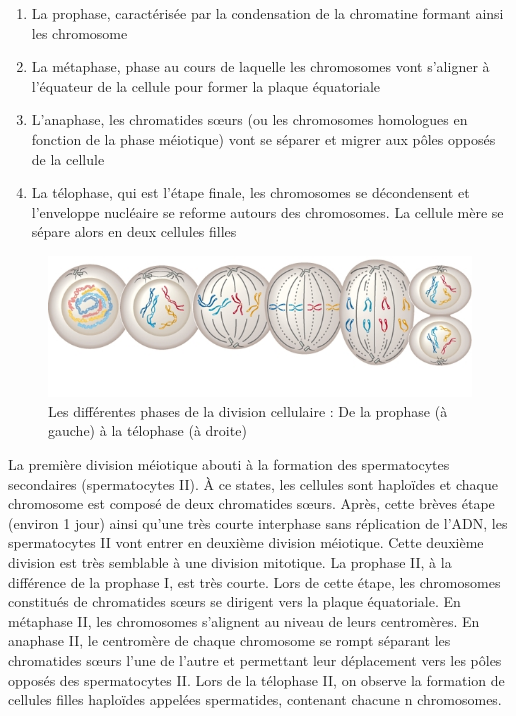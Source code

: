 \documentclass[12pt,twoside]{reedthesis}
\providecommand{\tightlist}{%
  \setlength{\itemsep}{0pt}\setlength{\parskip}{0pt}}
\theoremstyle{definition}
\theoremstyle{definition}
\theoremstyle{remark}
\begin{document}
  \begin{enumerate}
  \def\labelenumi{\arabic{enumi}.}
  \tightlist
  \item
    La prophase, caractérisée par la condensation de la chromatine formant
    ainsi les chromosome\\
  \item
    La métaphase, phase au cours de laquelle les chromosomes vont
    s'aligner à l'équateur de la cellule pour former la plaque
    équatoriale\\
  \item
    L'anaphase, les chromatides sœurs (ou les chromosomes homologues en
    fonction de la phase méiotique) vont se séparer et migrer aux pôles
    opposés de la cellule\\
  \item
    La télophase, qui est l'étape finale, les chromosomes se décondensent
    et l'enveloppe nucléaire se reforme autours des chromosomes. La
    cellule mère se sépare alors en deux cellules filles
  \end{enumerate}
  
  \begin{figure}
  
  {\centering \includegraphics[scale=.5]{figure/phases_mitose} 
  
  }
  
  \caption[Les différentes phases de la division cellulaire]{Les différentes phases de la division cellulaire : De la prophase (à gauche) à la télophase (à droite)}\label{fig:mitose}
  \end{figure}
  
  La première division méiotique abouti à la formation des spermatocytes
  secondaires (spermatocytes II). À ce states, les cellules sont haploïdes
  et chaque chromosome est composé de deux chromatides sœurs. Après, cette
  brèves étape (environ 1 jour) ainsi qu'une très courte interphase sans
  réplication de l'ADN, les spermatocytes II vont entrer en deuxième
  division méiotique. Cette deuxième division est très semblable à une
  division mitotique. La prophase II, à la différence de la prophase I,
  est très courte. Lors de cette étape, les chromosomes constitués de
  chromatides sœurs se dirigent vers la plaque équatoriale. En métaphase
  II, les chromosomes s'alignent au niveau de leurs centromères. En
  anaphase II, le centromère de chaque chromosome se rompt séparant les
  chromatides sœurs l'une de l'autre et permettant leur déplacement vers
  les pôles opposés des spermatocytes II. Lors de la télophase II, on
  observe la formation de cellules filles haploïdes appelées spermatides,
  contenant chacune n chromosomes.
  
\end{document}
